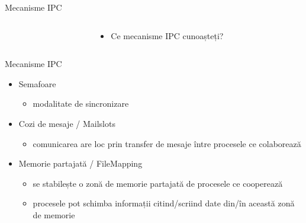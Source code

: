 \documentclass{so.cs.pub.ro}
\begin{document}
\begin{frame}{Mecanisme IPC}
\begin{columns}
\begin{column}[1]{0.55\textwidth}
\end{column}
\begin{column}[1]{0.35\textwidth}
      \begin{itemize}
        \item Ce mecanisme IPC cunoașteți?
      \end{itemize}
\end{column}
\end{columns}
\end{frame}

\begin{frame}{Mecanisme IPC}
      \begin{itemize}
        \item Semafoare 
        \begin{itemize}
        		\item modalitate de sincronizare
        \end{itemize}
        		\vspace{0.2cm}
        \item Cozi de mesaje / Mailslots
        \begin{itemize}
        		\item comunicarea are loc prin transfer de mesaje între procesele ce colaborează
        \end{itemize}  
        		\vspace{0.2cm}      
        \item Memorie partajată / FileMapping
        \begin{itemize}
        		\item se stabilește o zonă de memorie partajată de procesele ce cooperează
        		\item procesele pot schimba informații citind/scriind date din/în această zonă de memorie
        \end{itemize}
      \end{itemize}
\end{frame}
\end{document}
